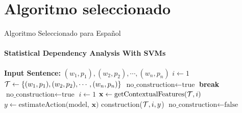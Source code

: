 \documentclass[utf8,draft]{beamer}
\begin{document}
  \section{Algoritmo seleccionado}
  \begin{frame}[label=alg]{Algoritmo Seleccionado para Español}
    \framesubtitle{Statistical Dependency Analysis With SVMs}
      \scriptsize
  \begin{algorithmic}[1] %
    \State \textbf{Input Sentence:} $(w_1, p_1),(w_2,p_2),\cdots,(w_n,p_n)$
    \Init
       \State $i\gets 1$
       \State ${\cal T}\gets \{(w_1, p_1),(w_2,p_2),\cdots,(w_n,p_n)\}$
       \State $\text{no\_construction}\gets \text{true}$
    \EndInit
                \textbf{break}
             \EndIf
             \State $\text{no\_construction}\gets \text{true}$
             \State $i\gets 1$
          \Else
             \State $\mathbf{x}\gets \text{getContextualFeatures(${\cal T}, i$)} $
             \State $y\gets \text{estimateAction(model, $\mathbf{x}$)}$
             \State construction(${\cal T}, i, y$)
                $\text{no\_construction}\gets \text{false}$
             \EndIf
          \EndIf
       \EndWhile
    \end{algorithmic}
  \end{frame}
\end{document}
